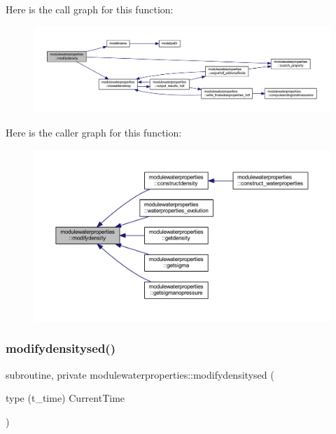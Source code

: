 Here is the call graph for this function\+:\nopagebreak
\begin{figure}[H]
\begin{center}
\leavevmode
\includegraphics[width=350pt]{namespacemodulewaterproperties_a7727e3b2ffd1b7f1c501dc60cf64c723_cgraph}
\end{center}
\end{figure}
Here is the caller graph for this function\+:\nopagebreak
\begin{figure}[H]
\begin{center}
\leavevmode
\includegraphics[width=350pt]{namespacemodulewaterproperties_a7727e3b2ffd1b7f1c501dc60cf64c723_icgraph}
\end{center}
\end{figure}
\mbox{\label{namespacemodulewaterproperties_a430bfd6acd72693785ebf7d3e3a9dea8}} 
\subsubsection{\texorpdfstring{modifydensitysed()}{modifydensitysed()}}
{\footnotesize\ttfamily subroutine, private modulewaterproperties\+::modifydensitysed (\begin{DoxyParamCaption}\item[{type (t\+\_\+time)}]{Current\+Time }\end{DoxyParamCaption})\hspace{0.3cm}{\ttfamily [private]}}

